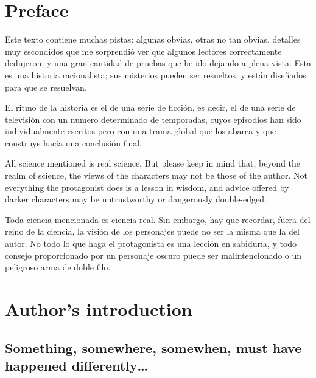 \chapter*{Preface}

Este texto contiene muchas pistas: algunas obvias, otras no tan obvias, detalles muy escondidos que me sorprendió ver que algunos lectores correctamente dedujeron, y una gran cantidad de pruebas que he ido dejando a plena vista. Esta es una historia racionalista; sus misterios pueden ser resueltos, y están diseñados para que se resuelvan.

El ritmo de la historia es el de una serie de ficción, es decir, el de una serie de televisión con un numero determinado de temporadas, cuyos episodios han sido individualmente escritos pero con una trama global que los abarca y que construye hacia una conclusión final.


All science mentioned is real science. But please keep in mind that, beyond the realm of science, the views of the characters may not be those of the author. Not everything the protagonist does is a lesson in wisdom, and advice offered by darker characters may be untrustworthy or dangerously double-edged.

Toda ciencia mencionada es ciencia real. Sin embargo, hay que recordar, fuera del reino de la ciencia, la visión de los personajes puede no ser la misma que la del autor. No todo lo que haga el protagonista es una lección en sabiduría, y todo consejo proporcionado por un personaje oscuro puede ser malintencionado o un peligroso arma de doble filo.

\chapter*{Author’s introduction}

\section*{Something, somewhere, somewhen, must have happened differently…}

